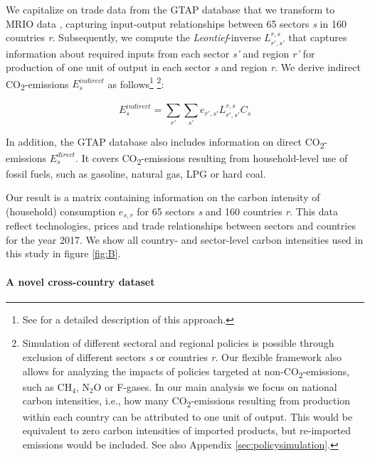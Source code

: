 \documentclass[12pt, a4paper]{article}
\begin{document}
We capitalize on trade data from the GTAP database \autocite[Version 11, ][]{Aguiar.2022} that we transform to MRIO data \autocite{Peters.2011}, capturing input-output relationships between 65 sectors \textit{s} in 160 countries \textit{r}. Subsequently, we compute the \textit{Leontief}-inverse $L_{r',s'}^{r,s}$ that captures information about required inputs from each sector \textit{s'} and region \textit{r'} for production of one unit of output in each sector \textit{s} and region \textit{r}. We derive indirect CO\textsubscript{2}-emissions $E_{s}^{indirect}$ as follows\footnote{See \textcite{Missbach.2024, Steckel.2021b,Feindt.2021,VogtSchilb.2019} for a detailed description of this approach.} \footnote{Simulation of different sectoral and regional policies is possible through exclusion of different sectors \textit{s} or countries \textit{r}. Our flexible framework also allows for analyzing the impacts of policies targeted at non-CO\textsubscript{2}-emissions, such as CH$_{4}$, N$_{2}$O or F-gases. In our main analysis we focus on national carbon intensities, i.e., how many CO\textsubscript{2}-emissions resulting from production within each country can be attributed to one unit of output. This would be equivalent to zero carbon intensities of imported products, but re-imported emissions would be included. See also Appendix \ref{sec:policysimulation}.}:

\begin{equation}
    E_{s}^{indirect} = \sum_{r'} \sum_{s'} e_{r',s'} L_{r',s'}^{r,s} C_{s}
\end{equation}

In addition, the GTAP database also includes information on direct CO\textsubscript{2}-emissions $E_{s}^{direct}$. It covers CO\textsubscript{2}-emissions resulting from household-level use of fossil fuels, such as gasoline, natural gas, LPG or hard coal.

Our result is a matrix containing information on the carbon intensity of (household) consumption $e_{s,r}$ for 65 sectors \textit{s} and 160 countries \textit{r}. This data reflect technologies, prices and trade relationships between sectors and countries for the year 2017. We show all country- and sector-level carbon intensities used in this study in figure \ref{fig:B}.

\paragraph{A novel cross-country dataset} 
\end{document}
